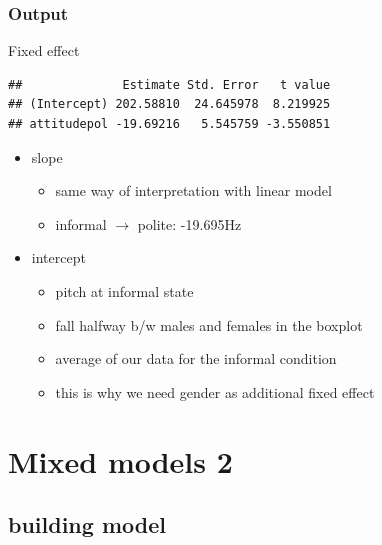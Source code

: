 \documentclass[10p]{beamer}\usepackage[]{graphicx}\usepackage[]{color}
\makeatletter
\newenvironment{kframe}{%
 \def\at@end@of@kframe{}%
 \ifinner\ifhmode%
  \def\at@end@of@kframe{\end{minipage}}%
  \begin{minipage}{\columnwidth}%
 \fi\fi%
 \def\FrameCommand##1{\hskip\@totalleftmargin \hskip-\fboxsep
 \colorbox{shadecolor}{##1}\hskip-\fboxsep
     \hskip-\linewidth \hskip-\@totalleftmargin \hskip\columnwidth}%
 \MakeFramed {\advance\hsize-\width
   \@totalleftmargin\z@ \linewidth\hsize
   \@setminipage}}%
 {\par\unskip\endMakeFramed%
 \at@end@of@kframe}
\newenvironment{knitrout}{}{} %
\makeatother
\begin{document}
\begin{frame}[fragile]
\frametitle{Output}
Fixed effect
\begin{knitrout}\scriptsize
{}\color{fgcolor}\begin{kframe}
\begin{verbatim}
##              Estimate Std. Error   t value
## (Intercept) 202.58810  24.645978  8.219925
## attitudepol -19.69216   5.545759 -3.550851
\end{verbatim}
\end{kframe}
\end{knitrout}
\begin{itemize}
\item slope
	\begin{itemize}
\item same way of interpretation with linear model
\item informal $\rightarrow$ polite: -19.695Hz
	\end{itemize}
\item intercept 
	\begin{itemize}
	\item pitch at informal state
	\item fall halfway b/w males and females in the boxplot
	\item average of our data for the informal condition
	\item this is why we need gender as additional fixed effect
	\end{itemize}
\end{itemize}
\end{frame}

\section[Mixed 2]{Mixed models 2}
\subsection{building model}
\end{document}
